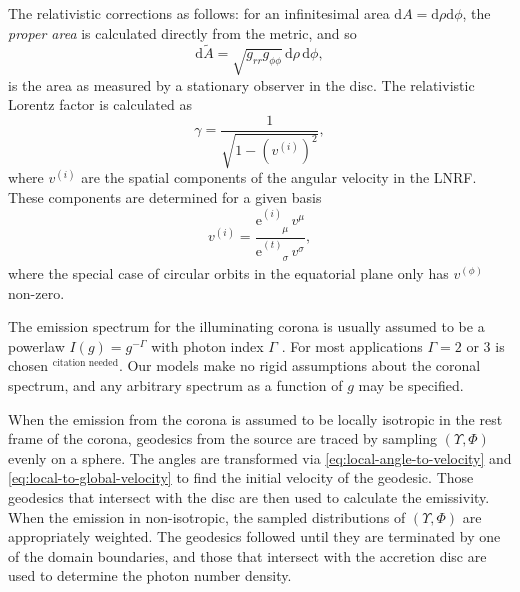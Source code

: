 \documentclass[fleqn,usenatbib]{mnras}
\newcommand{\citneeded}{{\bf \color{red} $^{\text{citation needed}}$}}
\newcommand{\e}{\text{e}}
\renewcommand{\d}{\text{d}}
\newcommand{\utensor}[3]{#1^{#2}_{\phantom{#2}#3}}
\begin{document}
The relativistic corrections as follows: for an infinitesimal area $\d A = \d
\rho\d\phi$, the \textit{proper area} is calculated directly from the metric,
and so
\begin{equation}
    \d\tilde{A} = \sqrt{g_{rr} g_{\phi\phi}}\, \d \rho\, \d \phi,
\end{equation}
is the area as measured by a stationary observer in the disc. The relativistic
Lorentz factor is calculated as
\begin{equation}
    \gamma = \frac{1}{\sqrt{1 - \left(v^{(i)}\right)^2}},
\end{equation}
where $v^{(i)}$ are the spatial components of the angular velocity in the LNRF.
These components are determined for a given basis
\begin{equation}
    v^{(i)} = \frac{\utensor{\e}{(i)}{\mu}\, v^\mu}{\utensor{\e}{(t)}{\sigma}\, v^\sigma},
\end{equation}
where the special case of circular orbits in the equatorial plane only has
$v^{(\phi)}$ non-zero.

The emission spectrum for the illuminating corona is usually assumed to be a
powerlaw $I(g) = g^{-\Gamma}$ with photon index $\Gamma$
\citep{gonzalez_probing_2017}. For most applications $\Gamma = 2$ or $3$ is
chosen \citneeded. Our models make no rigid assumptions about the coronal
spectrum, and any arbitrary spectrum as a function of $g$ may be specified.

When the emission from the corona is assumed to be locally isotropic in the rest
frame of the corona, geodesics from the source are traced by sampling
$(\Upsilon, \Phi)$ evenly on a sphere. The angles are transformed via
\eqref{eq:local-angle-to-velocity} and \eqref{eq:local-to-global-velocity} to
find the initial velocity of the geodesic. Those geodesics that intersect with
the disc are then used to calculate the emissivity. When the emission in
non-isotropic, the sampled distributions of $(\Upsilon, \Phi)$ are appropriately
weighted. The geodesics followed until they are terminated by one of the domain
boundaries, and those that intersect with the accretion disc are used to
determine the photon number density.
\end{document}

